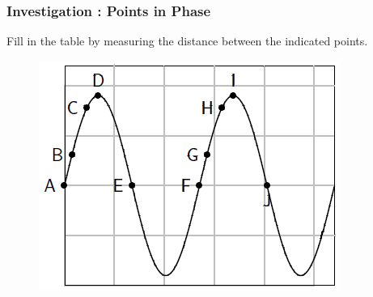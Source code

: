             \subsubsection{  Investigation : Points in Phase }
            \nopagebreak
        \label{m38806*id318912}Fill in the table by measuring the distance between the indicated points.\par 
        \label{m38806*id318918}
    \setcounter{subfigure}{0}
	\begin{figure}[H] %
    \begin{center}
    \label{m38806*id318921!!!underscore!!!media}\label{m38806*id318921!!!underscore!!!printimage}\includegraphics[width=0.4\columnwidth]{col11305.imgs/m38806_PG10C5_010.png} %
      \vspace{2pt}
    \vspace{.1in}
    \end{center}
 \end{figure}       
        \par 
